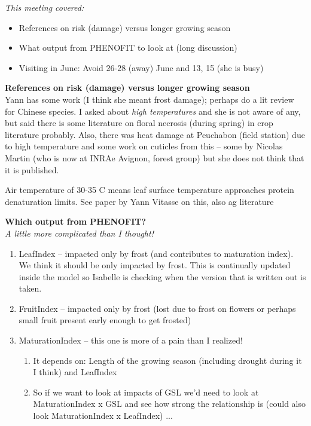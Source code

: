 \documentclass[11pt,letter]{article}
\begin{document}
\emph{This meeting covered:}
\begin{itemize}
\item References on risk (damage) versus longer growing season
\item What output from PHENOFIT to look at (long discussion)
\item Visiting in June: Avoid 26-28 (away) June and 13, 15 (she is busy)
\end{itemize}

{\bf References on risk (damage) versus longer growing season}\\

Yann has some work (I think she meant frost damage); perhaps do a lit review for Chinese species. I asked about \emph{high temperatures} and she is not aware of any, but said there is some literature on floral necrosis (during spring) in crop literature probably. Also, there was heat damage at Peuchabon (field station) due to high temperature and some work on cuticles from this -- some by Nicolas Martin (who is now at INRAe Avignon, forest group) but she does not think that it is published. %

Air temperature of 30-35 C means leaf surface temperature approaches protein denaturation limits. See paper by Yann Vitasse on this, also ag literature

{\bf Which output from PHENOFIT?}\\

\emph{A little more complicated than I thought!}

\begin{enumerate}
\item LeafIndex -- impacted only by frost (and contributes to maturation index). We think it should be only impacted by frost. This is continually updated inside the model so Isabelle is checking when the version that is written out is taken. 
\item FruitIndex -- impacted only by frost (lost due to frost on flowers or perhaps small fruit present early enough to get frosted)
\item MaturationIndex -- this one is more of a pain than I realized! 
\begin{enumerate}
\item It depends on: Length of the growing season (including drought during it I think) and LeafIndex
\item So if we want to look at impacts of GSL we'd need to look at MaturationIndex x GSL and see how strong the relationship is (could also look MaturationIndex x LeafIndex) ... 
\end{enumerate}
\end{enumerate}
\end{document}
